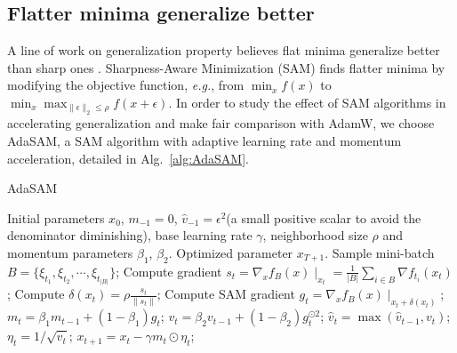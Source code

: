 \documentclass{article}
\begin{document}
\subsection{Flatter minima generalize better}
\vspace{-1em}
A line of work on generalization property believes flat minima generalize better than sharp ones \cite{keskar2016large}. Sharpness-Aware Minimization (SAM) \cite{foret2020sharpness} finds flatter minima by modifying the objective function, \textit{e.g.}, from $\min_x f(x)$ to $\min_x\max_{\|\epsilon\|_2\le\rho}f(x+\epsilon)$. In order to study the effect of SAM algorithms in accelerating generalization and make fair comparison with AdamW, we choose AdaSAM\cite{sun2024adasam}, a SAM algorithm with adaptive learning rate and momentum acceleration, detailed in Alg.~\ref{alg:AdaSAM}.
\vspace{-0.5em}
\renewcommand{\algorithmicrequire}{\textbf{Input: }}
\renewcommand{\algorithmicensure}{\textbf{Output: }}
\begin{algorithm}

    \caption{AdaSAM}\label{alg:AdaSAM}
    \begin{algorithmic}
    \REQUIRE Initial parameters $x_0$, $m_{-1}=0$, $\hat{v}_{-1}=\epsilon^2$(a small positive scalar to avoid the denominator diminishing), base learning rate $\gamma$, neighborhood size $\rho$ and momentum parameters $\beta_1$, $\beta_2$.
    \ENSURE Optimized parameter $x_{T+1}$.
    \STATE Sample mini-batch $B=\{\xi_{t_1},\xi_{t_2},\cdots,\xi_{t_{|B|}}\}$;
    \STATE Compute gradient $s_t=\nabla_xf_B(x)\mid_{x_t}=\frac{1}{|B|}\sum_{i\in B}\nabla f_{t_i}(x_t)$;
    \STATE Compute $\delta(x_t)=\rho\frac{s_t}{\|s_t\|}$;
    \STATE Compute SAM gradient $g_t=\nabla_x f_B(x)\mid_{x_t+\delta(x_t)}$;
    \STATE $m_t=\beta_1m_{t-1}+(1-\beta_1)g_t$;
    \STATE $v_t=\beta_2v_{t-1}+(1-\beta_2)g_t^{\odot2}$;
    \STATE $\hat{v}_t=\max(\hat{v}_{t-1},v_t)$;
    \STATE $\eta_t=1/\sqrt{\hat{v}_t}$;
    \STATE $x_{t+1}=x_t-\gamma m_t\odot\eta_t$;
    \ENDFOR
    \end{algorithmic}
    
\end{algorithm}
\end{document}
